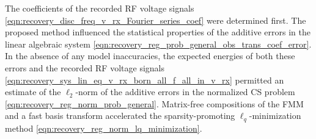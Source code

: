The  coefficients of
the recorded \ac{RF} voltage signals
\eqref{eqn:recovery_disc_freq_v_rx_Fourier_series_coef} were determined first.
The proposed method influenced
the statistical properties of
the additive errors in
the linear algebraic system
\eqref{eqn:recovery_reg_prob_general_obs_trans_coef_error}.
In
the absence of
any model inaccuracies,
the expected energies of both
these errors and
the recorded \ac{RF} voltage signals
\eqref{eqn:recovery_sys_lin_eq_v_rx_born_all_f_all_in_v_rx} permitted
an estimate of
the $\ell_{2}$-norm of
the additive errors in
the normalized \ac{CS} problem
\eqref{eqn:recovery_reg_norm_prob_general}.
Matrix-free compositions of
the \ac{FMM} and
a fast basis transform accelerated
the sparsity-promoting $\ell_{q}$-minimization method
\eqref{eqn:recovery_reg_norm_lq_minimization}.

